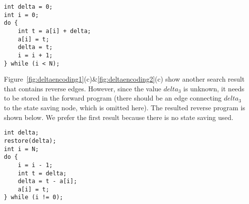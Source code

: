 \begin{lstlisting}
int delta = 0;
int i = 0;
do {
    int t = a[i] + delta;
    a[i] = t;
    delta = t;
    i = i + 1;
} while (i < N);
\end{lstlisting}

Figure~\ref{fig:deltaencoding1}(c)\&\ref{fig:deltaencoding2}(c) show another search result that contains reverse edges.
However, since the value $delta_3$ is unknown, it needs to be stored in the forward program (there should be an edge connecting $delta_3$ to the state saving node, which is omitted here).
The resulted reverse program is shown below.
We prefer the first result because there is no state saving used.
%
%

\begin{lstlisting}
int delta;
restore(delta);
int i = N;
do {
    i = i - 1;
    int t = delta;
    delta = t - a[i];
    a[i] = t;
} while (i != 0);
\end{lstlisting}

\begin{comment}

Assume at runtime the number of iterations of the loop is $n$.
Let $t$ be the loop index in the original loop, where $t\in [1:n]$.
For every value defined in the loop, we add $t$ to it as a superscript to show that value in the iteration $t$.

We acquire each element of $a_0$ from $a_1$ using the index $i_1^t$.
Assume during the loop, the subregion $R$ of the array $a$ is modified.
We add a summary edge between $a_0$ and $a_3$ with subregion $\overline{R}$ in which elements of $a$ stay unchanged.



In general, for an array updated in a loop, between the output of the iteration $t$ and the output of the loop for the array (in our example, $a_3$ and $a_4$ respectively), we add a subregion showing in which part of the array they have the same elements.
Let $I$ include all indices at which the array is modified in the loop (in our example, $I=\{i_1,j_2\}$).
Then at the end of the iteration $t$, the subregion of the array that will be modified during the following iterations is $R(t,n) = \bigcup_{i\in I}{\bigcup_{t\le r\le n}{\{i^r\}}}$.
Then $R=R(0)$.
At the beginning of the iterations $t$, the subregion on with $a_0$ and $a_1$ have the same elements is $R(0,t-1)$.

\end{comment}


